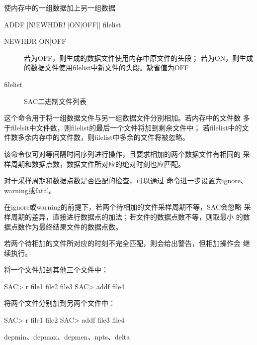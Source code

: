 \label{cmd:addf}

使内存中的一组数据加上另一组数据

\begin{SACSTX}
ADDF [N!EWHDR! [ON|OFF]] filelist
\end{SACSTX}

\begin{description}
\item [NEWHDR ON|OFF] 若为OFF，则生成的数据文件使用内存中原文件的头段；
    若为ON，则生成的数据文件使用filelist中新文件的头段。缺省值为OFF
\item [filelist] SAC二进制文件列表
\end{description}

这个命令用于将一组数据文件与另一组数据文件分别相加。若内存中的文件数
多于filelsit中文件数，则filelist的最后一个文件将加到剩余文件中；
若filelist中的文件数多余内存中的文件数，则filelist中多余的文件将被忽略。

该命令仅可对等间隔时间序列进行操作，且要求相加的两个数据文件有相同的
采样周期和数据点数，数据文件所对应的绝对时刻也应匹配。

对于采样周期和数据点数是否匹配的检查，可以通过 
命令进一步设置为ignore、warning或fatal。

在ignore或warning的前提下，若两个待相加的文件采样周期不等，SAC会忽略
采样周期的差异，直接进行数据点的加法；若文件的数据点数不等，则取最小
的数据点数作为最终结果文件的数据点数。

若两个待相加的文件所对应的时刻不完全匹配，则会给出警告，但相加操作会
继续执行。

将一个文件加到其他三个文件中：
\begin{SACCode}
SAC> r file1 file2 file3
SAC> addf file4
\end{SACCode}

将两个文件分别加到另两个文件中：
\begin{SACCode}
SAC> r file1 file2
SAC> addf file3 file4
\end{SACCode}

depmin、depmax、depmen、npts、delta
